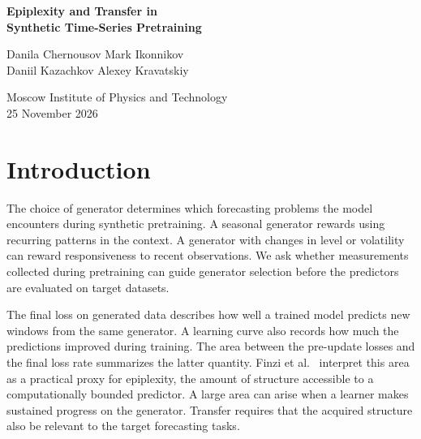 \documentclass[10pt,a4paper]{article}
\theoremstyle{definition}
\begin{document}
\begin{center}
{\LARGE\bfseries Epiplexity and Transfer in\\Synthetic Time-Series Pretraining\par}
\vspace{8pt}
Danila Chernousov \quad Mark Ikonnikov\\
Daniil Kazachkov \quad Alexey Kravatskiy\\[3pt]
{\small Moscow Institute of Physics and Technology\\
25 November 2026\par}
\end{center}
\begin{abstract}
Synthetic time-series generators provide a choice of pretraining distributions
for zero-shot forecasting. We test whether that choice can be guided by
\emph{excess prequential loss}, the cumulative difference between a model's
pre-update losses and its final held-out loss rate on generated data. We
compare eleven generators using one Moirai architecture at two training budgets
and evaluate the final predictors on GIFT-Eval. Forecast quality varies
widely across generators, but the full-set rank associations with the
prequential area are weak at both budgets. Changes to the final predictor can
markedly alter the area, and an additional Waveform initialization changes
downstream accuracy with little change in area. At the smaller budget,
requential KL gives a similar generator ranking and has a weak association
with downstream CRPS. Predictive $\mathcal V$-information also has weak
associations with CRPS at both budgets. We characterize when excess
prequential loss can diverge from model description length and show that a
change of proper scoring rule can reverse the ranking.
\end{abstract}

\section{Introduction}
The choice of generator determines which forecasting problems the model
encounters during synthetic pretraining. A seasonal generator rewards
using recurring patterns in the context. A generator with changes in level
or volatility can reward responsiveness to recent observations. We ask
whether measurements collected during pretraining can guide generator
selection before the predictors are evaluated on target datasets.

The final loss on generated data describes how well a trained model predicts
new windows from the same generator. A learning curve also records how much
the predictions improved during training. The area between the pre-update
losses and the final loss rate summarizes the latter quantity. Finzi
et al.~\cite{finzi2026} interpret this area as a practical proxy for
epiplexity, the amount of structure accessible to a computationally bounded
predictor. A large area can arise when a learner makes sustained progress on
the generator. Transfer requires that the acquired structure also be relevant
to the target forecasting tasks.
\end{document}
